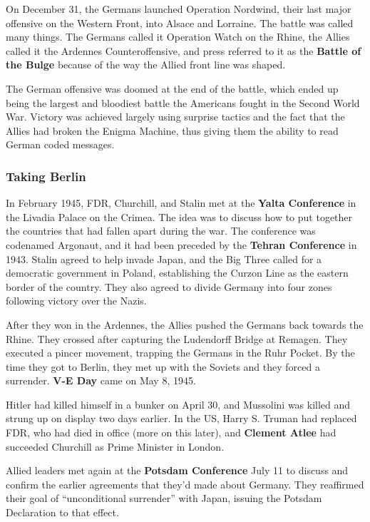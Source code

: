 On December 31, the Germans launched Operation Nordwind, their last major offensive on the Western Front,
into Alsace and Lorraine.
The battle was called many things.
The Germans called it Operation Watch on the Rhine,
the Allies called it the Ardennes Counteroffensive,
and press referred to it as the \textbf{Battle of the Bulge} because of the way the Allied front line was shaped.

The German offensive was doomed at the end of the battle,
which ended up being the largest and bloodiest battle the Americans fought in the Second World War.
Victory was achieved largely using surprise tactics and the fact that the Allies had broken the Enigma Machine,
thus giving them the ability to read German coded messages.

\subsubsection*{Taking Berlin}

In February 1945, FDR, Churchill, and Stalin met at the \textbf{Yalta Conference} in the Livadia Palace on the Crimea.
The idea was to discuss how to put together the countries that had fallen apart during the war.
The conference was codenamed Argonaut, and it had been preceded by the \textbf{Tehran Conference} in 1943.
Stalin agreed to help invade Japan,
and the Big Three called for a democratic government in Poland,
establishing the Curzon Line as the eastern border of the country.
They also agreed to divide Germany into four zones following victory over the Nazis.

After they won in the Ardennes, the Allies pushed the Germans back towards the Rhine.
They crossed after capturing the Ludendorff Bridge at Remagen.
They executed a pincer movement, trapping the Germans in the Ruhr Pocket.
By the time they got to Berlin, they met up with the Soviets and they forced a surrender.
\textbf{V-E Day} came on May 8, 1945.

Hitler had killed himself in a bunker on April 30,
and Mussolini was killed and strung up on display two days earlier.
In the US, Harry S. Truman had replaced FDR, who had died in office (more on this later),
and \textbf{Clement Atlee} had succeeded Churchill as Prime Minister in London.

Allied leaders met again at the \textbf{Potsdam Conference} July 11
to discuss and confirm the earlier agreements that they'd made about Germany.
They reaffirmed their goal of ``unconditional surrender'' with Japan,
issuing the Potsdam Declaration to that effect.

